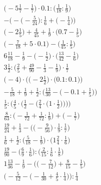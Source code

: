 \documentclass[8pt]{article}
\begin{document}
\begin{align}
\big(-5\frac{1}{7} - \frac{1}{7}\big) \cdot 0.1 : \big(\frac{1}{18} : \frac{1}{9}\big) \\
-\Big(-\big(-\frac{5}{24}\big) : \frac{1}{6} + \big(-\frac{1}{4}\big)\Big) \\
\big(-2\frac{1}{5}\big) + \frac{4}{45} + \frac{1}{9} \cdot \big(0.7 - \frac{1}{5}\big) \\
\big(-\frac{7}{18} + 5 \cdot 0.1\big) - \big(\frac{1}{45} : \frac{1}{5}\big) \\
6\frac{11}{18} - \frac{1}{9} - \big(-\frac{1}{2}\big) \cdot \big(\frac{13}{42} - \frac{1}{6}\big) \\
3\frac{1}{2} : \big(\frac{2}{5} + \frac{49}{90} - \frac{1}{3} - \frac{1}{9}\big) \cdot \frac{1}{7} \\
\Big(-4\Big) \cdot \Big(\big(-2\frac{1}{2}\big) \cdot \big(0.1 : 0.1\big)\Big) \\
-\frac{5}{18} + \frac{1}{9} + \frac{1}{2} : \Big(\frac{13}{30} - \big(-0.1 + \frac{1}{5}\big)\Big) \\
\frac{1}{5} : \Bigg(\frac{4}{5} \cdot \bigg(\frac{1}{2} - \Big(\frac{2}{4} \cdot \big(1 \cdot \frac{1}{2}\big)\Big)\bigg)\Bigg) \\
\frac{8}{63} : \big(-\frac{1}{72} + \frac{1}{72} : \frac{1}{9}\big) + \big(-\frac{1}{7}\big) \\
\frac{19}{24} + \frac{1}{3} - \Big(\big(-\frac{9}{56}\big) \cdot \frac{1}{9} : \frac{1}{7}\Big) \\
\frac{1}{6} + \frac{1}{2} : \big(\frac{5}{18} - \frac{1}{9}\big) \cdot \big(1\frac{2}{4} \cdot \frac{1}{6}\big) \\
\frac{19}{90} - \big(\frac{6}{9} \cdot \frac{1}{6}\big) : \big(\frac{2}{15} : \frac{1}{6} \cdot \frac{1}{8}\big) \\
1\frac{13}{36} - \frac{1}{9} - \Big(\big(-\frac{7}{12}\big) + \frac{8}{15} - \frac{1}{5}\Big) \\
\Big(-\frac{5}{12} - \big(-\frac{1}{30} + \frac{4}{5} \cdot \frac{1}{4}\big)\Big) : \frac{1}{4}
\end{align}
\end{document}
